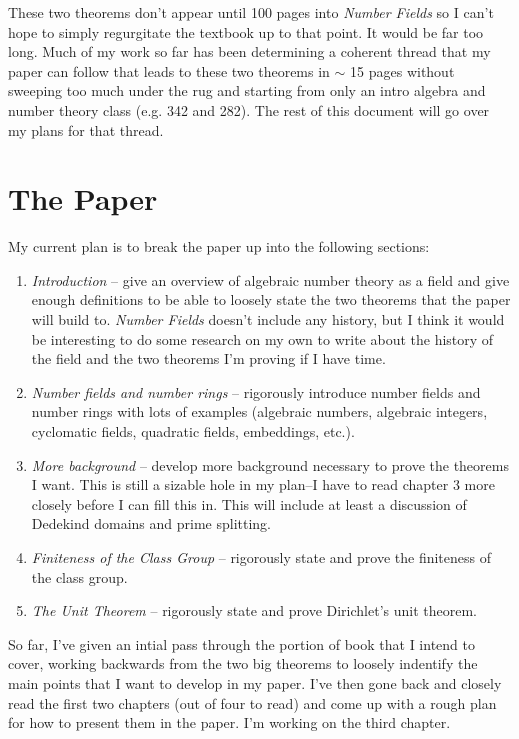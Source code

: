 \documentclass{ali-hw}
\begin{document}
These two theorems don't appear until 100 pages into \textit{Number Fields} so I can't hope to simply regurgitate the textbook up to that point. It would be far too long. Much of my work so far has been determining a coherent thread that my paper can follow that leads to these two theorems in $\sim$ 15 pages without sweeping too much under the rug and starting from only an intro algebra and number theory class (e.g. 342 and 282). The rest of this document will go over my plans for that thread.

\section{The Paper}

My current plan is to break the paper up into the following sections:

\begin{enumerate}
	\item \textit{Introduction} -- give an overview of algebraic number theory as a field and give enough definitions to be able to loosely state the two theorems that the paper will build to. \textit{Number Fields} doesn't include any history, but I think it would be interesting to do some research on my own to write about the history of the field and the two theorems I'm proving if I have time.
	\item \textit{Number fields and number rings} -- rigorously introduce number fields and number rings with lots of examples (algebraic numbers, algebraic integers, cyclomatic fields, quadratic fields, embeddings, etc.).
	\item \textit{More background} -- develop more background necessary to prove the theorems I want. This is still a sizable hole in my plan--I have to read chapter 3 more closely before I can fill this in. This will include at least a discussion of Dedekind domains and prime splitting.
	\item \textit{Finiteness of the Class Group} -- rigorously state and prove the finiteness of the class group.
	\item \textit{The Unit Theorem} -- rigorously state and prove Dirichlet's unit theorem.
\end{enumerate}

So far, I've given an intial pass through the portion of book that I intend to cover, working backwards from the two big theorems to loosely indentify the main points that I want to develop in my paper. I've then gone back and closely read the first two chapters (out of four to read) and come up with a rough plan for how to present them in the paper. I'm working on the third chapter.
\end{document}
